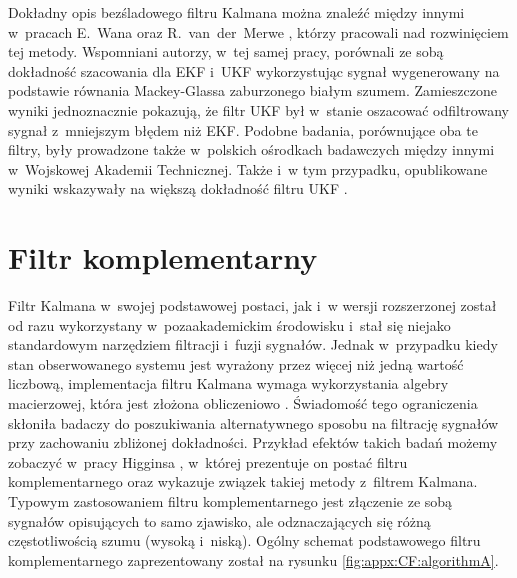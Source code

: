 		
Dokładny opis bezśladowego filtru Kalmana można znaleźć między innymi w~pracach E.~Wana oraz R.~van~der~Merwe \cite{Wan2000, Wan2001}, którzy pracowali nad rozwinięciem tej metody. Wspomniani autorzy, w~tej samej pracy, porównali ze sobą dokładność szacowania dla EKF i~UKF wykorzystując sygnał wygenerowany na podstawie równania Mackey-Glassa \cite{Glass2010} zaburzonego białym szumem. Zamieszczone wyniki jednoznacznie pokazują, że filtr UKF był w~stanie oszacować odfiltrowany sygnał z~mniejszym błędem niż EKF. Podobne badania, porównujące oba te filtry, były prowadzone także w~polskich ośrodkach badawczych między innymi w~Wojskowej Akademii Technicznej. Także i~w tym przypadku, opublikowane wyniki wskazywały na większą dokładność filtru UKF \cite{Konatowski2007, Konatowski2007a}.
		
\section*{Filtr komplementarny}\label{sec:appx:filters:CF}
Filtr Kalmana w~swojej podstawowej postaci, jak i~w wersji rozszerzonej został od razu wykorzystany w~pozaakademickim środowisku i~stał się niejako standardowym narzędziem filtracji i~fuzji sygnałów. Jednak w~przypadku kiedy stan obserwowanego systemu jest wyrażony przez więcej niż jedną wartość liczbową, implementacja filtru Kalmana wymaga wykorzystania algebry macierzowej, która jest złożona obliczeniowo \cite{wiki:MatrixAlgebraComplexity2016}. Świadomość tego ograniczenia skłoniła badaczy do poszukiwania alternatywnego sposobu na filtrację sygnałów przy zachowaniu zbliżonej dokładności. Przykład efektów takich badań możemy zobaczyć w~pracy Higginsa \cite{Higgins1975}, w~której prezentuje on postać filtru komplementarnego oraz wykazuje związek takiej metody z~filtrem Kalmana. Typowym zastosowaniem filtru komplementarnego jest złączenie ze sobą sygnałów opisujących to samo zjawisko, ale odznaczających się różną częstotliwością szumu (wysoką i~niską). Ogólny schemat podstawowego filtru komplementarnego zaprezentowany został na rysunku \ref{fig:appx:CF:algorithmA}.
		
\newcommand{\suma}{\Large$+$}
\newcommand{\inte}{$\displaystyle \int$}
\newcommand{\derv}{\huge$\frac{d}{dt}$}
		

